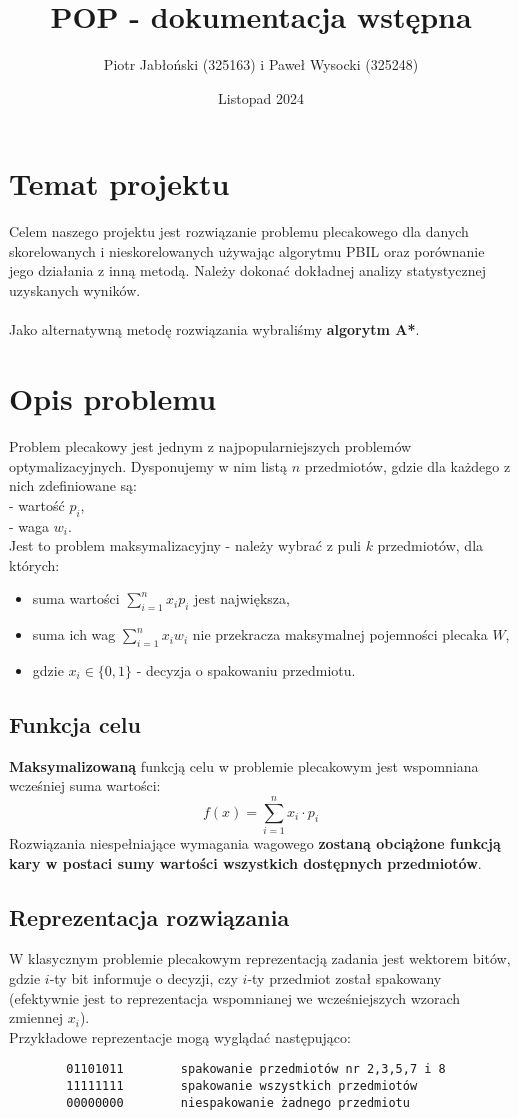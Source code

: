 \documentclass[11pt]{article}
\author{Piotr Jabłoński (325163) i Paweł Wysocki (325248)}
\date{Listopad 2024}
\title{POP - dokumentacja wstępna}
\begin{document}
\maketitle
\tableofcontents

\pagebreak
\section{Temat projektu}
\label{sec:org66d662c}
Celem naszego projektu jest rozwiązanie problemu plecakowego dla danych skorelowanych i nieskorelowanych używając algorytmu PBIL oraz porównanie jego działania z inną metodą. Należy dokonać dokładnej analizy statystycznej uzyskanych wyników. \\\\
Jako alternatywną metodę rozwiązania wybraliśmy \textbf{algorytm A*}.
\section{Opis problemu}
\label{sec:org4d991fb}
Problem plecakowy jest jednym z najpopularniejszych problemów optymalizacyjnych. 
Dysponujemy w nim listą $n$ przedmiotów, gdzie dla każdego z nich zdefiniowane są:\\
- wartość $p_i$,\\
- waga $w_i$.\\
Jest to problem maksymalizacyjny - należy wybrać z puli $k$ przedmiotów, dla których:
\begin{itemize}
    \item suma wartości $\sum_{i=1}^n x_i p_i$ jest największa,
    \item suma ich wag $\sum_{i=1}^n x_i w_i$ nie przekracza maksymalnej pojemności plecaka $W$,
    \item gdzie $x_i \in \{0,1\}$ - decyzja o spakowaniu przedmiotu.
\end{itemize}

\subsection{Funkcja celu}
\label{sec:orgfed3d26}
\textbf{Maksymalizowaną} funkcją celu w problemie plecakowym jest wspomniana wcześniej suma wartości:
$$
f(x) = \sum_{i=1}^n x_i \cdot p_i
$$
Rozwiązania niespełniające wymagania wagowego \textbf{zostaną obciążone funkcją kary w postaci sumy wartości wszystkich dostępnych przedmiotów}.
\subsection{Reprezentacja rozwiązania}
\label{sec:org7c490b7}
W klasycznym problemie plecakowym reprezentacją zadania jest wektorem bitów, gdzie $i$-ty bit informuje o decyzji, czy $i$-ty przedmiot został spakowany (efektywnie jest to reprezentacja wspomnianej we wcześniejszych wzorach zmiennej $x_i$). \\
Przykładowe reprezentacje mogą wyglądać następująco:
\begin{verbatim}
        01101011        spakowanie przedmiotów nr 2,3,5,7 i 8
        11111111        spakowanie wszystkich przedmiotów
        00000000        niespakowanie żadnego przedmiotu
\end{verbatim}
\end{document}
